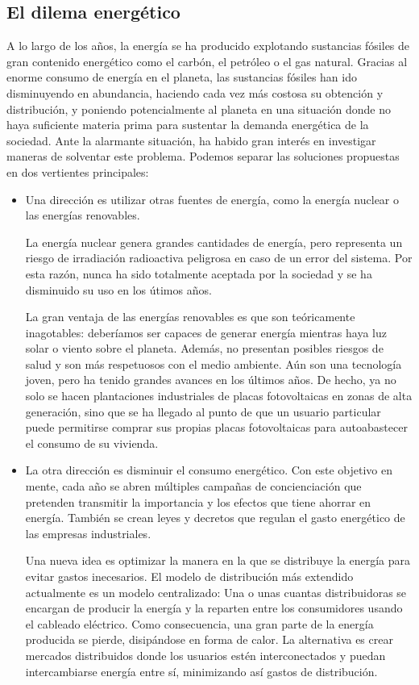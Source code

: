 \documentclass[12pt,a4paper,openright,oneside]{article}
\numberwithin{equation}{section}
\theoremstyle{definition}
\begin{document}
\subsection{El dilema energético}
A lo largo de los años, la energía se ha producido explotando sustancias fósiles de gran contenido energético como el carbón, el petróleo o el gas natural. Gracias al enorme consumo de energía en el planeta, las sustancias fósiles han ido disminuyendo en abundancia, haciendo cada vez más costosa su obtención y distribución, y poniendo potencialmente al planeta en una situación donde no haya suficiente materia prima para sustentar la demanda energética de la sociedad. Ante la alarmante situación, ha habido gran interés en investigar maneras de solventar este problema. Podemos separar las soluciones propuestas en dos vertientes principales:
\begin{itemize}
\item Una dirección es utilizar otras fuentes de energía, como la energía nuclear o las energías renovables. 

La energía nuclear genera grandes cantidades de energía, pero representa un riesgo de irradiación radioactiva peligrosa en caso de un error del sistema. Por esta razón, nunca ha sido totalmente aceptada por la sociedad y se ha disminuido su uso en los útimos años. 

La gran ventaja de las energías renovables es que son teóricamente inagotables: deberíamos ser capaces de generar energía mientras haya luz solar o viento sobre el planeta. Además, no presentan posibles riesgos de salud y son más respetuosos con el medio ambiente. Aún son una tecnología joven, pero ha tenido grandes avances en los últimos años. De hecho, ya no solo se hacen plantaciones industriales de placas fotovoltaicas en zonas de alta generación, sino que se ha llegado al punto de que un usuario particular puede permitirse comprar sus propias placas fotovoltaicas para autoabastecer el consumo de su vivienda.

\item La otra dirección es disminuir el consumo energético. Con este objetivo en mente, cada año se abren múltiples campañas de concienciación que pretenden transmitir la importancia y los efectos que tiene ahorrar en energía. También se crean leyes y decretos que regulan el gasto energético de las empresas industriales.

Una nueva idea es optimizar la manera en la que se distribuye la energía para evitar gastos inecesarios. El modelo de distribución más extendido actualmente es un modelo centralizado: Una o unas cuantas distribuidoras se encargan de producir la energía y la reparten entre los consumidores usando el cableado eléctrico. Como consecuencia, una gran parte de la energía producida se pierde, disipándose en forma de calor. La alternativa es crear mercados distribuidos donde los usuarios estén interconectados y puedan intercambiarse energía entre sí, minimizando así gastos de distribución.

\end{itemize}
\end{document}
